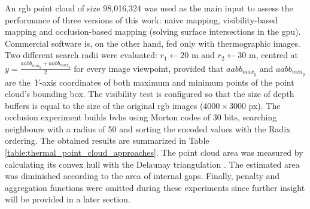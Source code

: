An \acrshort{rgb} point cloud of size 98,016,324 was used as the main input to assess the performance of three versions of this work: naive mapping, visibility-based mapping and occlusion-based mapping (solving surface intersections in the \acrshort{gpu}). Commercial software is, on the other hand, fed only with thermographic images. Two different search radii were evaluated: $r_1 \gets 20$ \si{\meter} and $r_2 \gets 30$ \si{\meter}, centred at $y = \frac{\textit{aabb}_{\textit{min}_{y}} + \textit{aabb}_{\textit{max}_{y}}}{2}$ for every image viewpoint, provided that $\textit{aabb}_{\textit{max}_{y}}$ and $\textit{aabb}_{\textit{min}_{y}}$ are the \textit{Y}-axis coordinates of both maximum and minimum points of the point cloud's bounding box. The visibility test is configured so that the size of depth buffers is equal to the size of the original \acrshort{rgb} images ($4000 \times 3000$ px). The occlusion experiment builds \acrshort{bvh}s using Morton codes of 30 bits, searching neighbours with a radius of 50 and sorting the encoded values with the Radix ordering. The obtained results are summarized in Table \ref{table:thermal_point_cloud_approaches}. The point cloud area was measured by calculating its convex hull with the Delaunay triangulation \cite{shewchuk_delaunay_2002}. The estimated area was diminished according to the area of internal gaps. Finally, penalty and aggregation functions were omitted during these experiments since further insight will be provided in a later section. 

